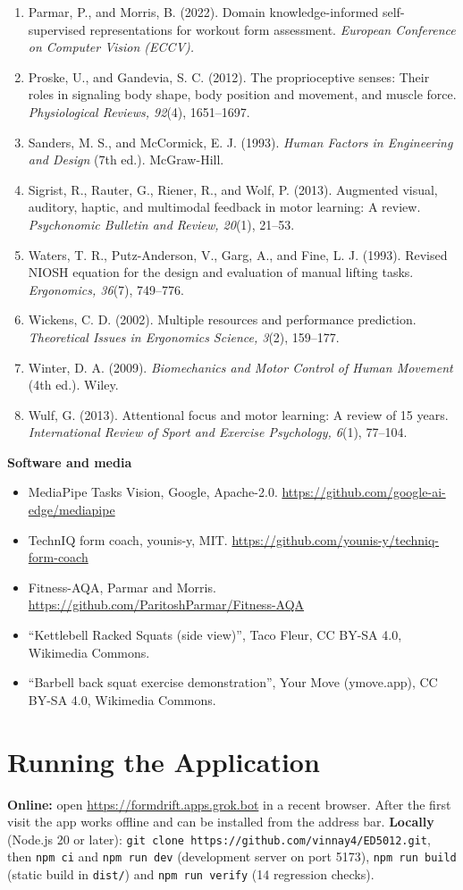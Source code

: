 \documentclass[12pt]{article}
\begin{document}
\begin{enumerate}
\item Parmar, P., and Morris, B. (2022). Domain knowledge-informed self-supervised representations for workout form assessment. \emph{European Conference on Computer Vision (ECCV).}
\item Proske, U., and Gandevia, S. C. (2012). The proprioceptive senses: Their roles in signaling body shape, body position and movement, and muscle force. \emph{Physiological Reviews, 92}(4), 1651--1697.
\item Sanders, M. S., and McCormick, E. J. (1993). \emph{Human Factors in Engineering and Design} (7th ed.). McGraw-Hill.
\item Sigrist, R., Rauter, G., Riener, R., and Wolf, P. (2013). Augmented visual, auditory, haptic, and multimodal feedback in motor learning: A review. \emph{Psychonomic Bulletin and Review, 20}(1), 21--53.
\item Waters, T. R., Putz-Anderson, V., Garg, A., and Fine, L. J. (1993). Revised NIOSH equation for the design and evaluation of manual lifting tasks. \emph{Ergonomics, 36}(7), 749--776.
\item Wickens, C. D. (2002). Multiple resources and performance prediction. \emph{Theoretical Issues in Ergonomics Science, 3}(2), 159--177.
\item Winter, D. A. (2009). \emph{Biomechanics and Motor Control of Human Movement} (4th ed.). Wiley.
\item Wulf, G. (2013). Attentional focus and motor learning: A review of 15 years. \emph{International Review of Sport and Exercise Psychology, 6}(1), 77--104.
\end{enumerate}

\textbf{Software and media}
\begin{itemize}
\setlength{\itemsep}{2pt}
\item MediaPipe Tasks Vision, Google, Apache-2.0. \url{https://github.com/google-ai-edge/mediapipe}
\item TechnIQ form coach, younis-y, MIT. \url{https://github.com/younis-y/techniq-form-coach}
\item Fitness-AQA, Parmar and Morris. \url{https://github.com/ParitoshParmar/Fitness-AQA}
\item ``Kettlebell Racked Squats (side view)'', Taco Fleur, CC BY-SA 4.0, Wikimedia Commons.
\item ``Barbell back squat exercise demonstration'', Your Move (ymove.app), CC BY-SA 4.0, Wikimedia Commons.
\end{itemize}
\normalsize

\appendix
\section{Running the Application}
\small
\textbf{Online:} open \url{https://formdrift.apps.grok.bot} in a recent browser. After the first visit the app works offline and can be installed from the address bar. \textbf{Locally} (Node.js 20 or later): \texttt{git clone https://github.com/vinnay4/ED5012.git}, then \texttt{npm ci} and \texttt{npm run dev} (development server on port 5173), \texttt{npm run build} (static build in \texttt{dist/}) and \texttt{npm run verify} (14 regression checks).
\normalsize
\end{document}
